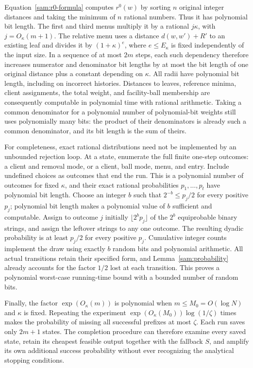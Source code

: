 Equation~\eqref{sam:r0-formula} computes $r^0(w)$ by sorting $n$ original
integer distances and taking the minimum of $n$ rational numbers.  Thus
it has polynomial bit length.  The first and third menus multiply it
by a rational $j\kappa$, with $j=O_\kappa(m+1)$.  The relative menu
uses a distance $d(w,w')+R'$ to an existing leaf and divides it by
$(1+\kappa)^e$, where $e\le E_\kappa$ is fixed independently of the
input size.  In a sequence of at most $2m$ steps, each such dependency
therefore increases numerator and denominator bit lengths by at most
the bit length of one original distance plus a constant depending on
$\kappa$.  All radii have polynomial bit length, including on incorrect
histories.  Distances to leaves, reference minima, client assignments,
the total weight, and facility-ball membership are consequently computable
in polynomial time with rational arithmetic.  Taking a common denominator
for a polynomial number of polynomial-bit weights still uses polynomially
many bits: the product of their denominators is already such a common
denominator, and its bit length is the sum of theirs.

For completeness, exact rational distributions need not be implemented by
an unbounded rejection loop.  At a state, enumerate the full finite
one-step outcomes: a client and removal mode, or a client, ball mode,
menu, and entry.  Include undefined choices as outcomes that end the run.
This is a polynomial number of outcomes for fixed $\kappa$, and their
exact rational probabilities $p_1,\ldots,p_t$ have polynomial bit length.
Choose an integer $b$ such that $2^{-b}\le p_j/2$ for every positive
$p_j$; polynomial bit length makes a polynomial value of $b$ sufficient
and computable.  Assign to outcome $j$ initially
$\lfloor2^bp_j\rfloor$ of the $2^b$ equiprobable binary strings, and
assign the leftover strings to any one outcome.  The resulting dyadic
probability is at least $p_j/2$ for every positive $p_j$.  Cumulative
integer counts implement the draw using exactly $b$ random bits and
polynomial arithmetic.  All actual transitions retain their specified
form, and Lemma~\ref{sam:probability} already accounts for the factor
$1/2$ lost at each transition.  This proves a polynomial worst-case
running-time bound with a bounded number of random bits.

Finally, the factor $\exp(O_\kappa(m))$ is polynomial when
$m\le M_0=O(\log N)$ and $\kappa$ is fixed.  Repeating the experiment
$\exp(O_\kappa(M_0))\log(1/\zeta)$ times makes the probability of
missing all successful prefixes at most $\zeta$.  Each run saves only
$2m+1$ states.  The completion procedure can therefore examine every
saved state, retain its cheapest feasible output together with the
fallback $S$, and amplify its own additional success probability without
ever recognizing the analytical stopping conditions.
